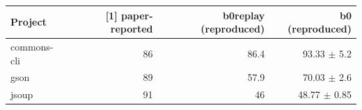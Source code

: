 \begin{tabular}{lrrr}
\toprule
Project & [1] paper-reported & b0replay (reproduced) & b0 (reproduced) \\
\midrule
commons-cli & 86 & 86.4 & 93.33 $\pm$ 5.2 \\
gson & 89 & 57.9 & 70.03 $\pm$ 2.6 \\
jsoup & 91 & 46 & 48.77 $\pm$ 0.85 \\
\bottomrule
\end{tabular}
